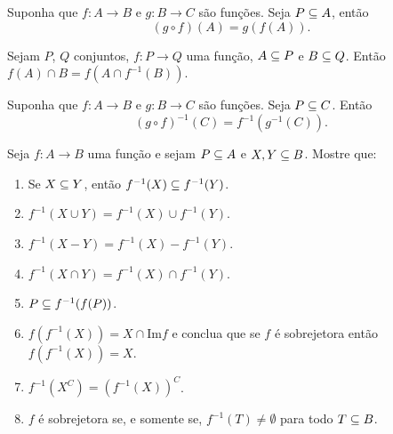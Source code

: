 \documentclass[12pt]{exam}
\begin{document}
    \vspace{.3cm}

    \questao{} Suponha que $f : A \to B$ e $g : B \to C$ são funções. Seja $P \subseteq A$, então
    \[
        (g \circ f)(A) = g(f(A)).
    \]

    \vspace{.3cm}

    \questao{} Sejam $P$, $Q$ conjuntos, $f : P \to Q$ uma função, $A \subseteq P$ e $B \subseteq Q$. Então $f(A) \cap B = f(A \cap f^{-1}(B))$.

    \vspace{.3cm}

    \questao{} Suponha que $f : A \to B$ e $g : B \to C$ são funções. Seja $P \subseteq C$. Então
    \[
        (g \circ f)^{-1}(C) = f^{-1}(g^{-1}(C)).
    \]

    \newpage

    \questao{} Seja $f : A \to B$ uma fun{\c c}{\~a}o e sejam $P \subseteq
    A$ e $X, Y\subseteq B$. Mostre que:
    \begin{enumerate}[label={\alph*})]
        \item Se $X\subseteq Y$, ent{\~a}o $f^{-1}(X)\subseteq f^{-1}(Y)$.

        \item $f^{-1}(X\cup Y)=f^{-1}(X)\cup f^{-1}(Y)$.

        \item $f^{-1}(X - Y) = f^{-1}(X) - f^{-1}(Y)$.

        \item $f^{-1}(X\cap Y)= f^{-1}(X)\cap f^{-1}(Y)$.

        \item $P\subseteq f^{-1}(f(P))$.

        \item $f(f^{-1}(X))= X \cap \mbox{Im}f$ e conclua que se $f$ {\'e} sobrejetora ent{\~a}o
        $f(f^{-1}(X))=X$.
        \item $f^{-1}(X^C) = (f^{-1}(X))^C$.

        \item $f$ \'e sobrejetora se, e somente se, $f^{-1}(T) \ne \emptyset$ para todo $T \subseteq B$.
    \end{enumerate}
\end{document}
